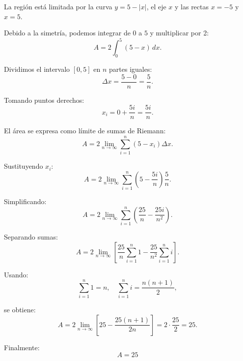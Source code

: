 \nopagebreak

La región está limitada por la curva \(y = 5 - |x|\), el eje \(x\) y las rectas
\(x=-5\) y \(x=5\).  

Debido a la simetría, podemos integrar de \(0\) a \(5\) y multiplicar por 2:
\[
A = 2 \int_{0}^{5} (5 - x) \, dx.
\]

Dividimos el intervalo \([0,5]\) en \(n\) partes iguales:
\[
\Delta x = \frac{5-0}{n} = \frac{5}{n}.
\]

Tomando puntos derechos:
\[
x_i = 0 + \frac{5i}{n} = \frac{5i}{n}.
\]

El área se expresa como límite de sumas de Riemann:
\[
A = 2 \lim_{n \to \infty} \sum_{i=1}^{n} \left(5 - x_i\right) \Delta x.
\]

Sustituyendo \(x_i\):
\[
A = 2 \lim_{n \to \infty} \sum_{i=1}^{n} \left(5 - \frac{5i}{n}\right) \frac{5}{n}.
\]

Simplificando:
\[
A = 2 \lim_{n \to \infty} \sum_{i=1}^{n} \left(\frac{25}{n} - \frac{25i}{n^2}\right).
\]

Separando sumas:
\[
A = 2 \lim_{n \to \infty} \left[
\frac{25}{n} \sum_{i=1}^{n} 1 - \frac{25}{n^2} \sum_{i=1}^{n} i
\right].
\]

Usando:
\[
\sum_{i=1}^{n} 1 = n, \quad \sum_{i=1}^{n} i = \frac{n(n+1)}{2},
\]

se obtiene:
\[
A = 2 \lim_{n \to \infty} \left[ 25 - \frac{25(n+1)}{2n} \right]
= 2 \cdot \frac{25}{2} = 25.
\]

Finalmente:
\[
\boxed{A = 25}
\]
